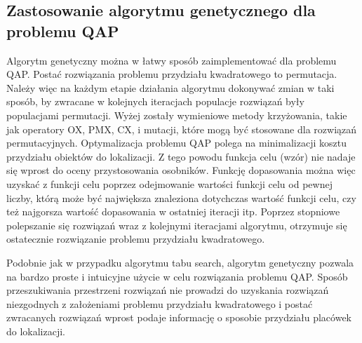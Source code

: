 \subsection{Zastosowanie algorytmu genetycznego dla problemu QAP}
Algorytm genetyczny można w łatwy sposób zaimplementować dla problemu QAP. Postać rozwiązania problemu przydziału kwadratowego to permutacja. Należy więc na każdym etapie działania algorytmu dokonywać zmian w taki sposób, by zwracane w kolejnych iteracjach populacje rozwiązań były populacjami permutacji. Wyżej zostały wymieniowe metody krzyżowania, takie jak operatory OX, PMX, CX, i mutacji, które mogą być stosowane dla rozwiązań permutacyjnych.
Optymalizacja problemu QAP polega na minimalizacji kosztu przydziału obiektów do lokalizacji. Z tego powodu funkcja celu (wzór) nie nadaje się wprost do oceny przystosowania osobników. Funkcję dopasowania można więc uzyskać z funkcji celu poprzez odejmowanie wartości funkcji celu od pewnej liczby, którą może być największa znaleziona dotychczas wartość funkcji celu, czy też najgorsza wartość dopasowania w ostatniej iteracji itp. Poprzez stopniowe polepszanie się rozwiązań wraz z kolejnymi iteracjami algorytmu, otrzymuje się ostatecznie rozwiązanie problemu przydziału kwadratowego. 

Podobnie jak w przypadku algorytmu tabu search, algorytm genetyczny pozwala na bardzo proste i  intuicyjne użycie w celu rozwiązania problemu QAP. Sposób przeszukiwania przestrzeni rozwiązań nie prowadzi do uzyskania rozwiązań niezgodnych z założeniami problemu przydziału kwadratowego i postać zwracanych rozwiązań wprost podaje informację o sposobie przydziału placówek do lokalizacji.